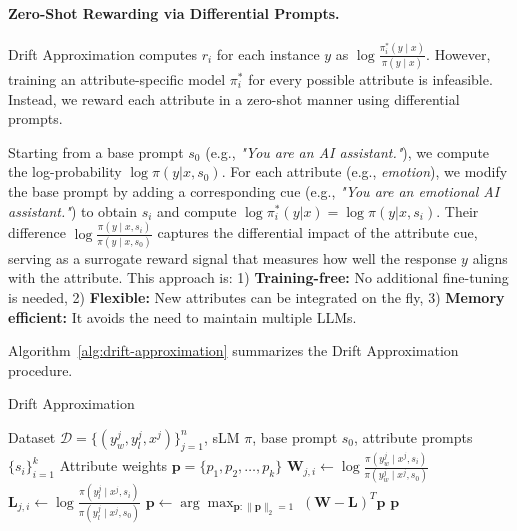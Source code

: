 \paragraph{Zero-Shot Rewarding via Differential Prompts.}  
Drift Approximation computes $r_i$ for each instance $y$ as $\log\frac{\pi_i^*(y \mid x)}{\pi(y \mid x)}$. However, training an attribute-specific model $\pi^*_i$ for every possible attribute is infeasible. Instead, we reward each attribute in a zero-shot manner using differential prompts. 

Starting from a base prompt $s_0$ (e.g., \textit{"You are an AI assistant."}), we compute the log-probability $\log \pi(y | x, s_0)$. For each attribute (e.g., \textit{\textcolor{blue2}{emotion}}), we modify the base prompt by adding a corresponding cue (e.g., \textit{"You are an \textcolor{blue2}{emotional} AI assistant."}) to obtain $s_i$ and compute $\log \pi_i^*(y | x)=\log \pi(y | x, s_i)$. Their difference $\log\frac{\pi(y \mid x, s_i)}{\pi(y \mid x, s_0)}$ captures the differential impact of the attribute cue, serving as a surrogate reward signal that measures how well the response $y$ aligns with the attribute. 
This approach is: 1) \textbf{Training-free:} No additional fine-tuning is needed, 2) \textbf{Flexible:} New attributes can be integrated on the fly, 3) \textbf{Memory efficient:} It avoids the need to maintain multiple LLMs.

Algorithm~\ref{alg:drift-approximation} summarizes the Drift Approximation procedure.

\algrenewcommand{}
\algrenewcommand{}
\begin{algorithm}[t]
\caption{Drift Approximation}
\label{alg:drift-approximation}
\begin{algorithmic}[1]
\Require Dataset $\mathcal{D} = \{(y^j_w, y^j_l, x^j)\}_{j=1}^n$, sLM $\pi$, base prompt $s_0$, attribute prompts $\{s_i\}_{i=1}^k$
\Ensure Attribute weights $\mathbf{p} = \{p_1, p_2, \dots, p_k\}$
 
     
        \State $\mathbf{W}_{j,i} \gets \log \frac{\pi(y^j_w\mid x^j, s_i)}{\pi(y^j_w\mid x^j, s_0)}$
        \State $\mathbf{L}_{j,i} \gets \log \frac{\pi(y^j_l\mid x^j, s_i)}{\pi(y^j_l\mid x^j, s_0)}$
    \EndFor
\EndFor
\State $\mathbf{p} \gets \arg\max_{\mathbf{p}:\|\mathbf{p}\|_2=1} \;  (\mathbf{W} - \mathbf{L})^T\mathbf{p}$
\State \Return $\mathbf{p}$
\end{algorithmic}
\end{algorithm}

